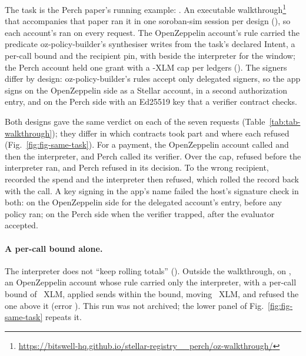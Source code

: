 The task is the Perch paper's running example: . An executable
walkthrough\footnote{\url{https://bitswell-hq.github.io/stellar-registry__perch/oz-walkthrough/}}
that accompanies that paper ran it in one soroban-sim session per
design (), so each account's  ran on every
request. The OpenZeppelin  account's rule carried the predicate
oz-policy-builder's synthesiser writes from the task's declared Intent, a per-call
bound and the recipient pin, with  beside the interpreter for the window; the Perch
account held one grant with a -XLM cap per
 ledgers (). The signers
differ by design: oz-policy-builder's rules accept only delegated signers, so the
app signs on the OpenZeppelin side as a Stellar account, in a second
authorization entry, and on the Perch side with an Ed25519 key that a verifier
contract checks.

Both designs gave the same verdict on each of the seven requests
(Table~\ref{tab:tab-walkthrough}); they differ in which contracts took part and
where each refused (Fig.~\ref{fig:fig-same-task}). For a payment, the
OpenZeppelin account called  and then the interpreter, and
Perch called its verifier. Over the cap,  refused before the
interpreter ran, and Perch refused in its decision. To the wrong recipient,
 recorded the spend and the interpreter then refused, which
rolled the record back with the call. A key signing in the app's name failed the
host's signature check in both: on the OpenZeppelin side for the delegated
account's entry, before any policy ran; on the Perch side when the verifier
trapped, after the evaluator accepted.


\paragraph{A per-call bound alone.} The interpreter does not ``keep rolling
totals'' (). Outside the walkthrough, on
, an OpenZeppelin account whose rule carried only the
interpreter, with a per-call bound of ~XLM, applied
 sends within the bound, moving
~XLM, and refused the one above it
(error ). This run was not archived; the
lower panel of Fig.~\ref{fig:fig-same-task} repeats it.

